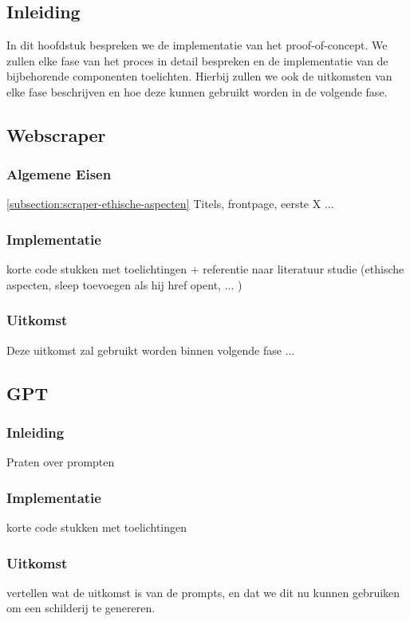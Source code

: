 \chapter{}%
\label{ch:proof-of-concept}
\section{Inleiding}
In dit hoofdstuk bespreken we de implementatie van het proof-of-concept. We zullen elke fase van het proces in detail bespreken en de implementatie van de bijbehorende componenten toelichten. Hierbij zullen we ook de uitkomsten van elke fase beschrijven en hoe deze kunnen gebruikt worden in de volgende fase. \\

\section{Webscraper}
\subsection{Algemene Eisen}
\ref{subsection:scraper-ethische-aspecten}
Titels, frontpage, eerste X ...
\subsection{Implementatie}
korte code stukken met toelichtingen + referentie naar literatuur studie (ethische aspecten, sleep toevoegen als hij href opent, ... )
\subsection{Uitkomst}
Deze uitkomst zal gebruikt worden binnen volgende fase ...  \\

\section{GPT}
\subsection{Inleiding}
Praten over prompten
\subsection{Implementatie}
korte code stukken met toelichtingen
\subsection{Uitkomst}
vertellen wat de uitkomst is van de prompts, en dat we dit nu kunnen gebruiken om een schilderij te genereren.

